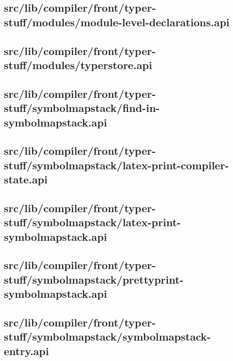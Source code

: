\subsection{src/lib/compiler/front/typer-stuff/modules/module-level-declarations.api}


\subsection{src/lib/compiler/front/typer-stuff/modules/typerstore.api}


\subsection{src/lib/compiler/front/typer-stuff/symbolmapstack/find-in-symbolmapstack.api}


\subsection{src/lib/compiler/front/typer-stuff/symbolmapstack/latex-print-compiler-state.api}


\subsection{src/lib/compiler/front/typer-stuff/symbolmapstack/latex-print-symbolmapstack.api}


\subsection{src/lib/compiler/front/typer-stuff/symbolmapstack/prettyprint-symbolmapstack.api}


\subsection{src/lib/compiler/front/typer-stuff/symbolmapstack/symbolmapstack-entry.api}


